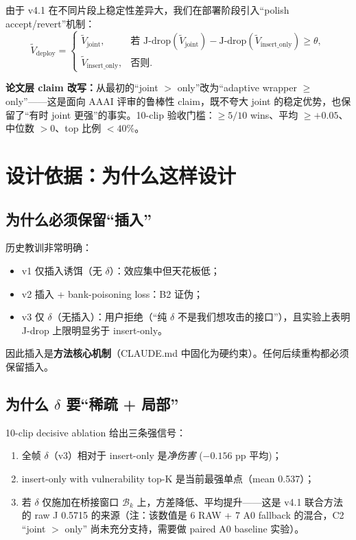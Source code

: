 \documentclass[11pt,a4paper]{ctexart}
\begin{document}
由于 v4.1 在不同片段上稳定性差异大，我们在部署阶段引入``polish accept/revert''机制：
\[
\tilde{V}_{\text{deploy}} =
\begin{cases}
\tilde{V}_{\text{joint}}, & \text{若 } \mathrm{J\text{-}drop}(\tilde{V}_{\text{joint}}) - \mathrm{J\text{-}drop}(\tilde{V}_{\text{insert\_only}}) \geq \theta, \\
\tilde{V}_{\text{insert\_only}}, & \text{否则}.
\end{cases}
\]

\textbf{论文层 claim 改写：}从最初的``joint $>$ only''改为``adaptive wrapper $\geq$ only''——这是面向 AAAI 评审的鲁棒性 claim，既不夸大 joint 的稳定优势，也保留了``有时 joint 更强''的事实。10-clip 验收门槛：$\geq 5/10$ wins、平均 $\geq +0.05$、中位数 $> 0$、top 比例 $< 40\%$。

\section{设计依据：为什么这样设计}
\label{sec:rationale}

\subsection{为什么必须保留``插入''}

历史教训非常明确：
\begin{itemize}[leftmargin=2em]
    \item v1 仅插入诱饵（无 $\delta$）：效应集中但天花板低；
    \item v2 插入 + bank-poisoning loss：B2 证伪；
    \item v3 仅 $\delta$（无插入）：用户拒绝（``纯 $\delta$ 不是我们想攻击的接口''），且实验上表明 J-drop 上限明显劣于 insert-only。
\end{itemize}

因此插入是\textbf{方法核心机制}（CLAUDE.md 中固化为硬约束）。任何后续重构都必须保留插入。

\subsection{为什么 $\delta$ 要``稀疏 + 局部''}

10-clip decisive ablation 给出三条强信号：
\begin{enumerate}[leftmargin=2em]
    \item 全帧 $\delta$（v3）相对于 insert-only 是\emph{净伤害} ($-0.156$ pp 平均)；
    \item insert-only with vulnerability top-K 是当前最强单点（mean 0.537）；
    \item 若 $\delta$ 仅施加在桥接窗口 $\mathcal{B}_k$ 上，方差降低、平均提升——这是 v4.1 联合方法的 raw J 0.5715 的来源（注：该数值是 6 RAW + 7 A0 fallback 的混合，C2 ``joint $>$ only'' 尚未充分支持，需要做 paired A0 baseline 实验）。
\end{enumerate}
\end{document}
